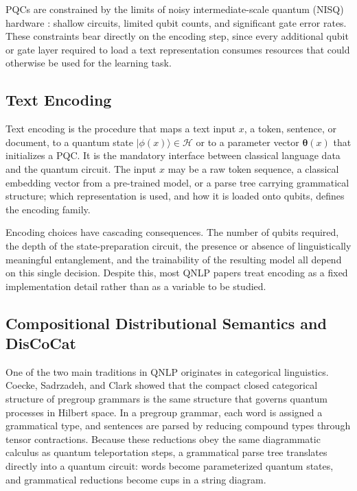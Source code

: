 \documentclass{ieeeaccess}
\begin{document}
PQCs are constrained by the limits of noisy intermediate-scale quantum (NISQ) hardware \cite{preskill2018quantum}: shallow circuits, limited qubit counts, and significant gate error rates. These constraints bear directly on the encoding step, since every additional qubit or gate layer required to load a text representation consumes resources that could otherwise be used for the learning task.

\subsection{Text Encoding}

Text encoding is the procedure that maps a text input $x$, a token, sentence, or document, to a quantum state $|\phi(x)\rangle \in \mathcal{H}$ or to a parameter vector $\boldsymbol{\theta}(x)$ that initializes a PQC. It is the mandatory interface between classical language data and the quantum circuit. The input $x$ may be a raw token sequence, a classical embedding vector from a pre-trained model, or a parse tree carrying grammatical structure; which representation is used, and how it is loaded onto qubits, defines the encoding family.

Encoding choices have cascading consequences. The number of qubits required, the depth of the state-preparation circuit, the presence or absence of linguistically meaningful entanglement, and the trainability of the resulting model all depend on this single decision. Despite this, most QNLP papers treat encoding as a fixed implementation detail rather than as a variable to be studied.

\subsection{Compositional Distributional Semantics and DisCoCat}

One of the two main traditions in QNLP originates in categorical linguistics. Coecke, Sadrzadeh, and Clark \cite{coecke2010mathematical} showed that the compact closed categorical structure of pregroup grammars is the same structure that governs quantum processes in Hilbert space. In a pregroup grammar, each word is assigned a grammatical type, and sentences are parsed by reducing compound types through tensor contractions. Because these reductions obey the same diagrammatic calculus as quantum teleportation steps, a grammatical parse tree translates directly into a quantum circuit: words become parameterized quantum states, and grammatical reductions become cups in a string diagram.
\end{document}

